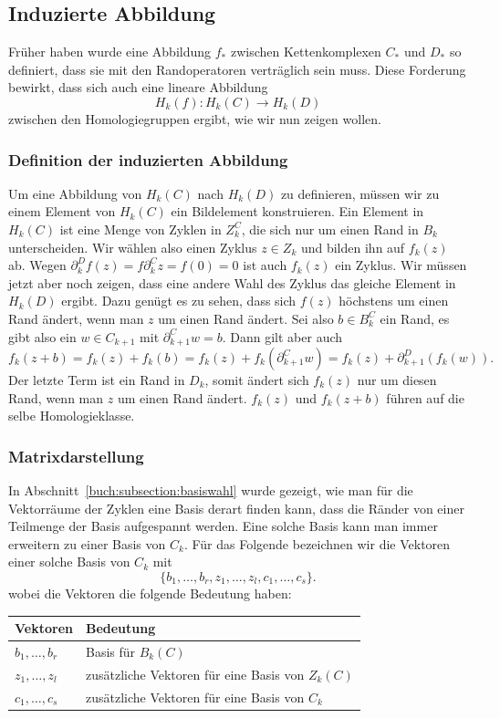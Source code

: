 \subsection{Induzierte Abbildung
\label{buch:subsection:induzierte-abbildung}}
Früher haben wurde eine Abbildung $f_*$ zwischen Kettenkomplexen $C_*$ und
$D_*$ so definiert,
dass sie mit den Randoperatoren verträglich sein muss.
Diese Forderung bewirkt, dass sich auch eine lineare Abbildung
\[
H_k(f) \colon H_k(C) \to H_k(D)
\]
zwischen den Homologiegruppen ergibt, wie wir nun zeigen wollen.

\subsubsection{Definition der induzierten Abbildung}
Um eine Abbildung von $H_k(C)$ nach $H_k(D)$ zu definieren, müssen wir
zu einem Element von $H_k(C)$ ein Bildelement konstruieren.
Ein Element in $H_k(C)$ ist eine Menge von Zyklen in $Z^C_k$, die sich
nur um einen Rand in $B_k$ unterscheiden.
Wir wählen also einen Zyklus $z\in Z_k$ und bilden ihn auf $f_k(z)$ ab.
Wegen $\partial^D_kf(z)=f\partial^C_kz = f(0) =0 $ ist auch $f_k(z)$
ein Zyklus.
Wir müssen jetzt aber noch zeigen, dass eine andere Wahl des Zyklus
das gleiche Element in $H_k(D)$ ergibt.
Dazu genügt es zu sehen, dass sich $f(z)$ höchstens um einen Rand
ändert, wenn man $z$ um einen Rand ändert.
Sei also $b\in B^C_k$ ein Rand, es gibt also ein $w\in C_{k+1}$ mit
$\partial^C_{k+1}w=b$.
Dann gilt aber auch
\[
f_k(z+b)
=
f_k(z) + f_k(b)
=
f_k(z) + f_k(\partial^C_{k+1}w)
=
f_k(z) + \partial^D_{k+1}(f_k(w)).
\]
Der letzte Term ist ein Rand in $D_k$, somit ändert sich $f_k(z)$ nur
um diesen Rand, wenn man $z$ um einen Rand ändert.
$f_k(z)$ und $f_k(z+b)$ führen auf die selbe Homologieklasse.

\subsubsection{Matrixdarstellung}
In Abschnitt~\ref{buch:subsection:basiswahl} wurde gezeigt, wie man
für die Vektorräume der Zyklen eine Basis derart finden kann, 
dass die Ränder von einer Teilmenge der Basis aufgespannt werden.
Eine solche Basis kann man immer erweitern zu einer Basis von $C_k$.
Für das Folgende bezeichnen wir die Vektoren einer solche Basis von $C_k$ 
mit
\[
\{
b_1,\dots, b_r,
z_1,\dots,z_l,
c_1,\dots,c_s
\}.
\]
wobei die Vektoren  die folgende Bedeutung haben:
\begin{center}
\begin{tabular}{|l|l|}
\hline
Vektoren&Bedeutung\\
\hline
$b_1,\dots,b_r$ & Basis für $B_k(C)$ \\
$z_1,\dots,z_l$ & zusätzliche Vektoren für eine Basis von $Z_k(C)$ \\
$c_1,\dots,c_s$ & zusätzliche Vektoren für eine Basis von $C_k$ \\
\hline
\end{tabular}
\end{center}

